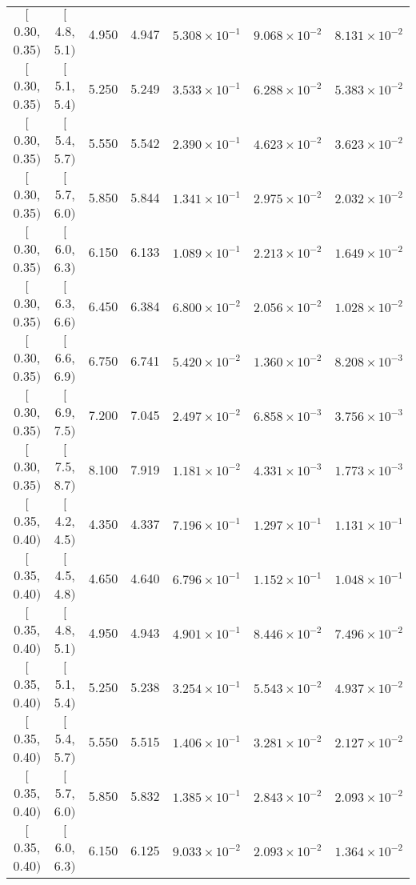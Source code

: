 \begin{longtable}{| c | c | c | c | c | c | c |}
$[$0.30, 0.35$)$ & $[$4.8, 5.1$)$ & 4.950 & 4.947 & $5.308 \times 10^{-1}$ & $9.068 \times 10^{-2}$ & $8.131 \times 10^{-2}$ \\
$[$0.30, 0.35$)$ & $[$5.1, 5.4$)$ & 5.250 & 5.249 & $3.533 \times 10^{-1}$ & $6.288 \times 10^{-2}$ & $5.383 \times 10^{-2}$ \\
$[$0.30, 0.35$)$ & $[$5.4, 5.7$)$ & 5.550 & 5.542 & $2.390 \times 10^{-1}$ & $4.623 \times 10^{-2}$ & $3.623 \times 10^{-2}$ \\
$[$0.30, 0.35$)$ & $[$5.7, 6.0$)$ & 5.850 & 5.844 & $1.341 \times 10^{-1}$ & $2.975 \times 10^{-2}$ & $2.032 \times 10^{-2}$ \\
$[$0.30, 0.35$)$ & $[$6.0, 6.3$)$ & 6.150 & 6.133 & $1.089 \times 10^{-1}$ & $2.213 \times 10^{-2}$ & $1.649 \times 10^{-2}$ \\
$[$0.30, 0.35$)$ & $[$6.3, 6.6$)$ & 6.450 & 6.384 & $6.800 \times 10^{-2}$ & $2.056 \times 10^{-2}$ & $1.028 \times 10^{-2}$ \\
$[$0.30, 0.35$)$ & $[$6.6, 6.9$)$ & 6.750 & 6.741 & $5.420 \times 10^{-2}$ & $1.360 \times 10^{-2}$ & $8.208 \times 10^{-3}$ \\
$[$0.30, 0.35$)$ & $[$6.9, 7.5$)$ & 7.200 & 7.045 & $2.497 \times 10^{-2}$ & $6.858 \times 10^{-3}$ & $3.756 \times 10^{-3}$ \\
$[$0.30, 0.35$)$ & $[$7.5, 8.7$)$ & 8.100 & 7.919 & $1.181 \times 10^{-2}$ & $4.331 \times 10^{-3}$ & $1.773 \times 10^{-3}$ \\
\hline
$[$0.35, 0.40$)$ & $[$4.2, 4.5$)$ & 4.350 & 4.337 & $7.196 \times 10^{-1}$ & $1.297 \times 10^{-1}$ & $1.131 \times 10^{-1}$ \\
$[$0.35, 0.40$)$ & $[$4.5, 4.8$)$ & 4.650 & 4.640 & $6.796 \times 10^{-1}$ & $1.152 \times 10^{-1}$ & $1.048 \times 10^{-1}$ \\
$[$0.35, 0.40$)$ & $[$4.8, 5.1$)$ & 4.950 & 4.943 & $4.901 \times 10^{-1}$ & $8.446 \times 10^{-2}$ & $7.496 \times 10^{-2}$ \\
$[$0.35, 0.40$)$ & $[$5.1, 5.4$)$ & 5.250 & 5.238 & $3.254 \times 10^{-1}$ & $5.543 \times 10^{-2}$ & $4.937 \times 10^{-2}$ \\
$[$0.35, 0.40$)$ & $[$5.4, 5.7$)$ & 5.550 & 5.515 & $1.406 \times 10^{-1}$ & $3.281 \times 10^{-2}$ & $2.127 \times 10^{-2}$ \\
$[$0.35, 0.40$)$ & $[$5.7, 6.0$)$ & 5.850 & 5.832 & $1.385 \times 10^{-1}$ & $2.843 \times 10^{-2}$ & $2.093 \times 10^{-2}$ \\
$[$0.35, 0.40$)$ & $[$6.0, 6.3$)$ & 6.150 & 6.125 & $9.033 \times 10^{-2}$ & $2.093 \times 10^{-2}$ & $1.364 \times 10^{-2}$ \\

\end{longtable}
